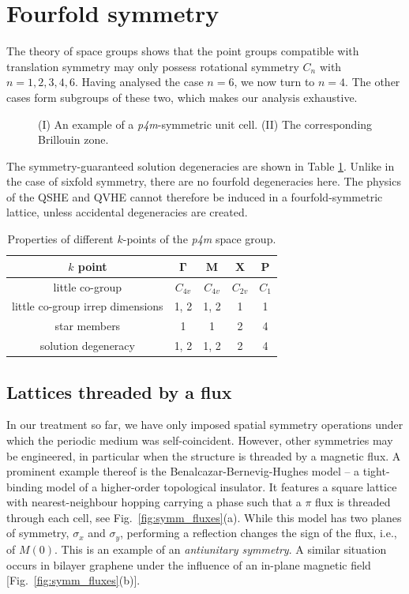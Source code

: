 \section{Fourfold symmetry} \label{sec:symm_fourfold}

The theory of space groups shows that the point groups compatible with translation symmetry may only possess rotational symmetry $C_n$ with $n = 1,2,3,4,6$. Having analysed the case $n=6$, we now turn to $n=4$. The other cases form subgroups of these two, which makes our analysis exhaustive. 

\begin{figure} [h!]
	\centering
	
	\caption{(I) An example of a \textit{p4m}-symmetric unit cell. (II) The corresponding Brillouin zone.}
	\label{fig:symm_p4m}
\end{figure}


The symmetry-guaranteed solution degeneracies are shown in Table \ref{table:symm_p4m_degs}. Unlike in the case of sixfold symmetry, there are no fourfold degeneracies here. The physics of the QSHE and QVHE cannot therefore be induced in a fourfold-symmetric lattice, unless accidental degeneracies are created. 

\begin{table} [h!]
	\centering
	\caption{Properties of different $k$-points of the \textit{p4m} space group. }
	\label{table:symm_p4m_degs}
	\begin{tabular}{ c c c c c }
		$k$ point & $\boldsymbol{\Gamma}$ & $\boldsymbol{M}$ & $\boldsymbol{X}$ & $\boldsymbol{P}$  \\ \hline
		little co-group & $C_{4v}$ & $C_{4v}$ & $C_{2v}$ & $C_1$ \\
		little co-group irrep dimensions & 1, 2 & 1, 2 & 1 & 1 \\
		star members & 1 & 1 & 2 & 4 \\
		solution degeneracy & 1, 2 & 1, 2 & 2 & 4 \\
	\end{tabular}
\end{table}

\subsection{Lattices threaded by a flux} \label{sec:symm_fluxes}

In our treatment so far, we have only imposed spatial symmetry operations under which the periodic medium was self-coincident. However, other symmetries may be engineered, in particular when the structure is threaded by a magnetic flux. A prominent example thereof is the Benalcazar-Bernevig-Hughes model -- a tight-binding model of a higher-order topological insulator. It features a square lattice with nearest-neighbour hopping carrying a phase such that a $\pi$ flux is threaded through each cell, see Fig.~\ref{fig:symm_fluxes}(a). While this model has two planes of symmetry, $\sigma_x$ and $\sigma_y$, performing a reflection changes the sign of the flux, i.e., of $M(0)$. This is an example of an \textit{antiunitary symmetry}. A similar situation occurs in bilayer graphene under the influence of an in-plane magnetic field [Fig.~\ref{fig:symm_fluxes}(b)]. 

